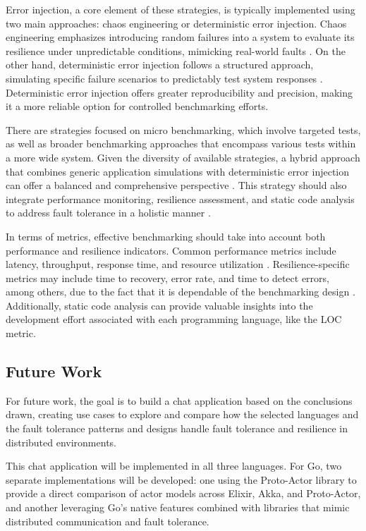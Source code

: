 Error injection, a core element of these strategies, is typically implemented using two main approaches: chaos engineering or deterministic error injection. Chaos engineering emphasizes introducing random failures into a system to evaluate its resilience under unpredictable conditions, mimicking real-world faults \cite{Almeida2013}. On the other hand, deterministic error injection follows a structured approach, simulating specific failure scenarios to predictably test system responses \cite{Randtoul2022}. Deterministic error injection offers greater reproducibility and precision, making it a more reliable option for controlled benchmarking efforts.

There are strategies focused on micro benchmarking, which involve targeted tests, as well as broader benchmarking approaches that encompass various tests within a more wide system. Given the diversity of available strategies, a hybrid approach that combines generic application simulations with deterministic error injection can offer a balanced and comprehensive perspective \cite{Randtoul2022}. This strategy should also integrate performance monitoring, resilience assessment, and static code analysis to address fault tolerance in a holistic manner \cite{Imam2014,Cardoso2013,Valkov2018,Randtoul2022}.

In terms of metrics, effective benchmarking should take into account both performance and resilience indicators. Common performance metrics include latency, throughput, response time, and resource utilization \cite{Imam2014,Valkov2018}. Resilience-specific metrics may include time to recovery, error rate, and time to detect errors, among others, due to the fact that it is dependable of the benchmarking design \cite{Randtoul2022,Blessing2019}. Additionally, static code analysis can provide valuable insights into the development effort associated with each programming language, like the \gls{LOC} metric.

\subsection{Future Work}

For future work, the goal is to build a chat application based on the conclusions drawn, creating use cases to explore and compare how the selected languages and the fault tolerance patterns and designs handle fault tolerance and resilience in distributed environments.

This chat application will be implemented in all three languages. For Go, two separate implementations will be developed: one using the Proto-Actor library to provide a direct comparison of actor models across Elixir, Akka, and Proto-Actor, and another leveraging Go’s native features combined with libraries that mimic distributed communication and fault tolerance.

